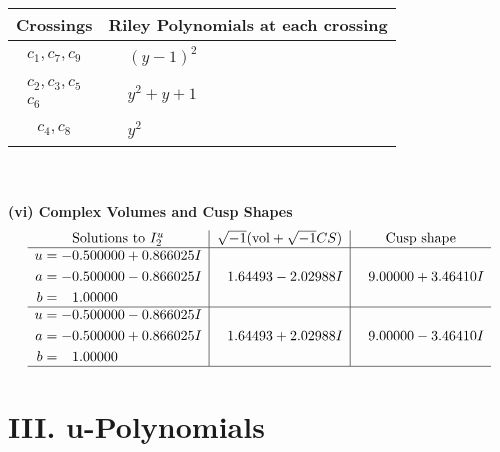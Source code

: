 \documentclass[1p]{elsarticle_modified}
\theoremstyle{definition}
\newcommand{\I}{\sqrt{-1}}
\begin{document}
\begin{tabular}{m{50pt}|m{274pt}}
Crossings & \hspace{64pt}Riley Polynomials at each crossing \\
\hline $$\begin{aligned}c_{1},c_{7},c_{9}\end{aligned}$$&$\begin{aligned}
&(y-1)^2
\end{aligned}$\\
\hline $$\begin{aligned}c_{2},c_{3},c_{5}\\c_{6}\end{aligned}$$&$\begin{aligned}
&y^2+y+1
\end{aligned}$\\
\hline $$\begin{aligned}c_{4},c_{8}\end{aligned}$$&$\begin{aligned}
&y^2
\end{aligned}$\\
\hline
\end{tabular}\\~\\
\newpage\flushleft \textbf{(vi) Complex Volumes and Cusp Shapes}
$$\begin{array}{c|c|c}  
\text{Solutions to }I^u_{2}& \I (\text{vol} + \sqrt{-1}CS) & \text{Cusp shape}\\
 \hline 
\begin{aligned}
u &= -0.500000 + 0.866025 I \\
a &= -0.500000 - 0.866025 I \\
b &= \phantom{-}1.00000\phantom{ +0.000000I}\end{aligned}
 & \phantom{-}1.64493 - 2.02988 I & \phantom{-}9.00000 + 3.46410 I \\ \hline\begin{aligned}
u &= -0.500000 - 0.866025 I \\
a &= -0.500000 + 0.866025 I \\
b &= \phantom{-}1.00000\phantom{ +0.000000I}\end{aligned}
 & \phantom{-}1.64493 + 2.02988 I & \phantom{-}9.00000 - 3.46410 I\\
 \hline 
 \end{array}$$\newpage
\newpage\renewcommand{\arraystretch}{1}
\centering \section*{ III. u-Polynomials}
\end{document}
